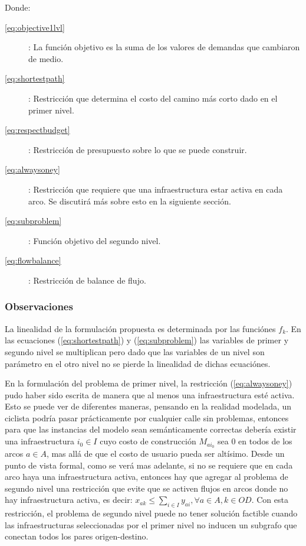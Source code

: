 \documentclass{article}
\begin{document}
  Donde:

  \begin{description}
    \item[\ref{eq:objective1lvl}]: La función objetivo es la suma de los valores de demandas que cambiaron de medio.
    \item[\ref{eq:shortestpath}]: Restricción que determina el costo del camino más corto dado en el primer nivel.
    \item[\ref{eq:respectbudget}]: Restricción de presupuesto sobre lo que se puede construir.
    \item[\ref{eq:alwaysoney}]: Restricción que requiere que una infraestructura estar activa en cada arco. Se discutirá más sobre esto en la siguiente sección.
    \item[\ref{eq:subproblem}]: Función objetivo del segundo nivel.
    \item[\ref{eq:flowbalance}]: Restricción de balance de flujo.
  \end{description}

  \subsubsection*{Observaciones}

  La linealidad de la formulación propuesta es determinada por las funciónes $f_k$. En las ecuaciones (\ref{eq:shortestpath}) y (\ref{eq:subproblem}) las variables de primer y segundo nivel se multiplican pero dado que las variables de un nivel son parámetro en el otro nivel no se pierde la linealidad de dichas ecuaciónes.

  En la formulación del problema de primer nivel, la restricción (\ref{eq:alwaysoney}) pudo haber sido escrita de manera que al menos una infraestructura esté activa. Esto se puede ver de diferentes maneras, pensando en la realidad modelada, un ciclista podría pasar prácticamente por cualquier calle sin problemas, entonces para que las instancias del modelo sean semánticamente correctas debería existir una infraestructura $i_0 \in I$ cuyo costo de construcción $M_{ai_0}$ sea 0 en todos de los arcos $a \in A$, mas allá de que el costo de usuario pueda ser altísimo. Desde un punto de vista formal, como se verá mas adelante, si no se requiere que en cada arco haya una infraestructura activa, entonces hay que agregar al problema de segundo nivel una restricción que evite que se activen flujos en arcos donde no hay infraestructura activa, es decir: $x_{ak} \leq \sum_{i \in I} y_{ai}, \forall a \in A, k \in OD$. Con esta restricción, el problema de segundo nivel puede no tener solución factible cuando las infraestructuras seleccionadas por el primer nivel no inducen un subgrafo que conectan todos los pares origen-destino.
\end{document}

